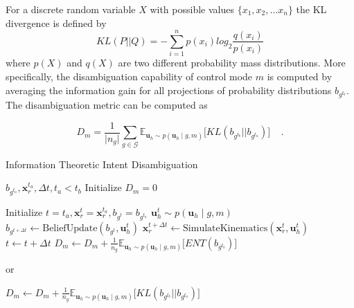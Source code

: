 \documentclass[conference]{IEEEtran}
\begin{document}
For a discrete random variable $X$ with possible values $\{x_1, x_2,\dots x_n\}$ the KL divergence is defined by
\begin{equation*}
KL(P||Q) = -\sum_{i=1}^{n}p(x_i)log_2\frac{q(x_i)}{p(x_i)}
\end{equation*}
where $p(X)$ and $q(X)$ are two different probability mass distributions. 
 More specifically, the disambiguation capability of control mode $m$ is computed by averaging the information gain for all projections of probability distributions $b_{g^{t_b}}$.  The disambiguation metric can be computed as 
 
 \begin{equation}\label{eq:kldiv}
 D_m = \frac{1}{\vert n_g \vert} \sum_{g \in \mathcal{G}}^{} \mathbb{E}_{\boldsymbol{u}_h \sim p(\boldsymbol{u}_h \; | \; g, m)}\Big[KL(b_{g^{t_b}}||b_{g^{t_a}})\Big] \;\;\;\;.
 \end{equation}
% 
\begin{algorithm}[t]
	\caption{Information Theoretic Intent Disambiguation}
	\label{alg:disamb}
	 \begin{algorithmic}[1]
	 	\REQUIRE $b_{g^{t_a}}, \boldsymbol{x}_r^{t_a}, \Delta t, t_a < t_b$
	 	\STATE Initialize $D_m = 0$
	 	
	 	\STATE Initialize $t = t_a, \boldsymbol{x}_r^{t} = \boldsymbol{x}_r^{t_a}, b_{g^{t}} = b_{g^{t_a}}$
	 	\STATE $\boldsymbol{u}_h^t \sim p(\boldsymbol{u}_h\;|\; g, m)$ 
	 	\STATE $b_{g^{t + \Delta t}} \leftarrow \text{BeliefUpdate}(b_{g^{t}}, \boldsymbol{u}_h^t)$
	 	\STATE $\boldsymbol{x}_r^{t + \Delta t}\leftarrow \text{SimulateKinematics}(\boldsymbol{x}_r^{t}, \boldsymbol{u}_h^t)$
	 	\STATE $t \leftarrow t + \Delta t$
	 	\ENDWHILE
	 	\STATE $D_m \leftarrow D_m + \frac{1}{n_g} \mathbb{E}_{\boldsymbol{u}_h \sim p(\boldsymbol{u}_h \; | \; g, m)}\Big[ENT(b_{g^{t_b}})\Big] $
	 	
	 	or
	 	
	 	\STATE $D_m \leftarrow D_m + \frac{1}{n_g} \mathbb{E}_{\boldsymbol{u}_h \sim p(\boldsymbol{u}_h \; | \; g, m)}\Big[KL(b_{g^{t_b}}||b_{g^{t_a}})\Big] $
	 	\ENDFOR
	 	\ENDFOR
	 \end{algorithmic}
\end{algorithm}
\end{document}
